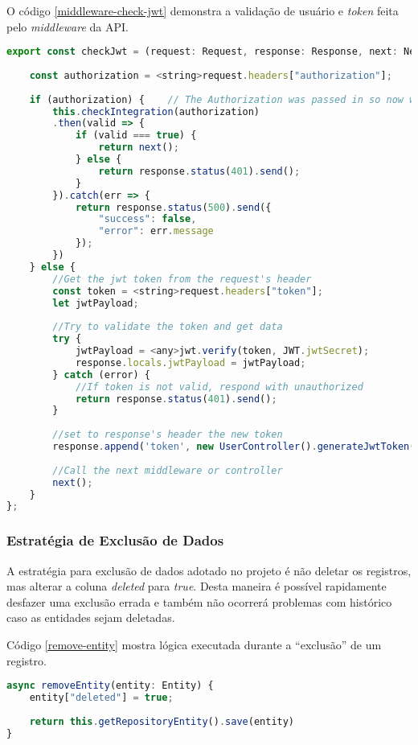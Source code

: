 O código \ref{middleware-check-jwt} demonstra a validação de usuário e \textit{token} feita pelo \textit{middleware} da API.
\begin{lstlisting}[language=JavaScript, caption={Função para validação de autenticação da API}, label={middleware-check-jwt}]
export const checkJwt = (request: Request, response: Response, next: NextFunction) => {
	
	const authorization = <string>request.headers["authorization"];
	
	if (authorization) {    // The Authorization was passed in so now we validate it
		this.checkIntegration(authorization)
		.then(valid => {
			if (valid === true) {
				return next();
			} else {
				return response.status(401).send();  
			}
		}).catch(err => {
			return response.status(500).send({
				"success": false,
				"error": err.message
			});
		})
	} else {
		//Get the jwt token from the request's header
		const token = <string>request.headers["token"];
		let jwtPayload;
		
		//Try to validate the token and get data
		try {
			jwtPayload = <any>jwt.verify(token, JWT.jwtSecret);
			response.locals.jwtPayload = jwtPayload;
		} catch (error) {
			//If token is not valid, respond with unauthorized
			return response.status(401).send();
		}
		
		//set to response's header the new token
		response.append('token', new UserController().generateJwtToken(<User> jwtPayload));
		
		//Call the next middleware or controller
		next();
	}
};

\end{lstlisting}


\subsubsection{Estratégia de Exclusão de Dados}

A estratégia para exclusão de dados adotado no projeto é não deletar os registros, mas alterar a coluna \textit{deleted} para \textit{true}. Desta maneira é possível rapidamente desfazer uma exclusão errada e também não ocorrerá problemas com histórico caso as entidades sejam deletadas.

Código \ref{remove-entity} mostra lógica executada durante a ``exclusão'' de um registro.
\begin{lstlisting}[language=JavaScript, caption={Método para exclusão de registro}, label={remove-entity}]
async removeEntity(entity: Entity) {
	entity["deleted"] = true;
	
	return this.getRepositoryEntity().save(entity)
}
\end{lstlisting}

